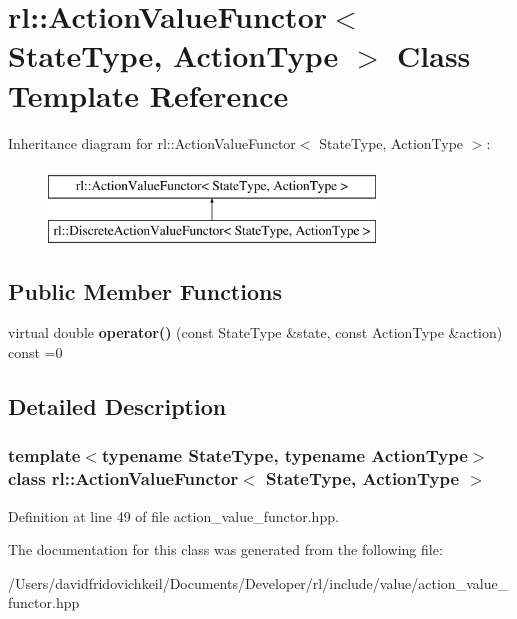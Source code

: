 \hypertarget{classrl_1_1_action_value_functor}{}\section{rl\+:\+:Action\+Value\+Functor$<$ State\+Type, Action\+Type $>$ Class Template Reference}
\label{classrl_1_1_action_value_functor}
Inheritance diagram for rl\+:\+:Action\+Value\+Functor$<$ State\+Type, Action\+Type $>$\+:\begin{figure}[H]
\begin{center}
\leavevmode
\includegraphics[height=2.000000cm]{classrl_1_1_action_value_functor}
\end{center}
\end{figure}
\subsection*{Public Member Functions}
\begin{DoxyCompactItemize}
\item 
\hypertarget{classrl_1_1_action_value_functor_af9cfc8284c860973783ddd4204b056b8}{}\label{classrl_1_1_action_value_functor_af9cfc8284c860973783ddd4204b056b8} 
virtual double {\bfseries operator()} (const State\+Type \&state, const Action\+Type \&action) const =0
\end{DoxyCompactItemize}


\subsection{Detailed Description}
\subsubsection*{template$<$typename State\+Type, typename Action\+Type$>$\newline
class rl\+::\+Action\+Value\+Functor$<$ State\+Type, Action\+Type $>$}



Definition at line 49 of file action\+\_\+value\+\_\+functor.\+hpp.



The documentation for this class was generated from the following file\+:\begin{DoxyCompactItemize}
\item 
/\+Users/davidfridovichkeil/\+Documents/\+Developer/rl/include/value/action\+\_\+value\+\_\+functor.\+hpp\end{DoxyCompactItemize}
